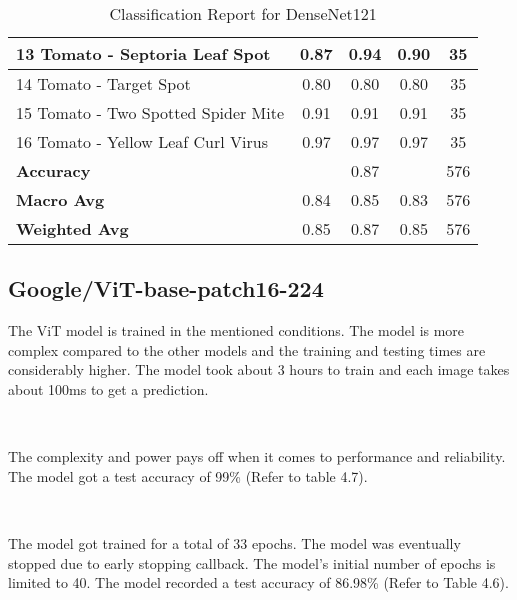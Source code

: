 \begin{table}[h!]
{\begin{tabular}{|l|c|c|c|c|}
    13 Tomato - Septoria Leaf Spot                    & 0.87               & 0.94            & 0.90              & 35               \\ \hline
    14 Tomato - Target Spot                           & 0.80               & 0.80            & 0.80              & 35               \\ \hline
    15 Tomato - Two Spotted Spider Mite               & 0.91               & 0.91            & 0.91              & 35               \\ \hline
    16 Tomato - Yellow Leaf Curl Virus                & 0.97               & 0.97            & 0.97              & 35               \\ \hline
    \textbf{Accuracy}                                 & \multicolumn{3}{c|}{0.87}            & 576              \\ \hline
    \textbf{Macro Avg}                                & 0.84               & 0.85            & 0.83              & 576              \\ \hline
    \textbf{Weighted Avg}                             & 0.85               & 0.87            & 0.85              & 576              \\ \hline
    \end{tabular}%
    }
    \caption{Classification Report for DenseNet121}
    \label{tab:classification_report_dn121}
    \end{table}

\subsection{Google/ViT-base-patch16-224}

The ViT model is trained in the mentioned conditions. The model is more complex compared to the other models and the training and testing times are considerably higher. The model took about 3 hours to train and each image takes about 100ms to get a prediction.

\

The complexity and power pays off when it comes to performance and reliability. The model got a test accuracy of 99\% (Refer to table 4.7).

\

The model got trained for a total of 33 epochs. The model was eventually stopped due to early stopping callback. The model's initial number of epochs is limited to 40. The model recorded a test accuracy of 86.98\% (Refer to Table 4.6).


